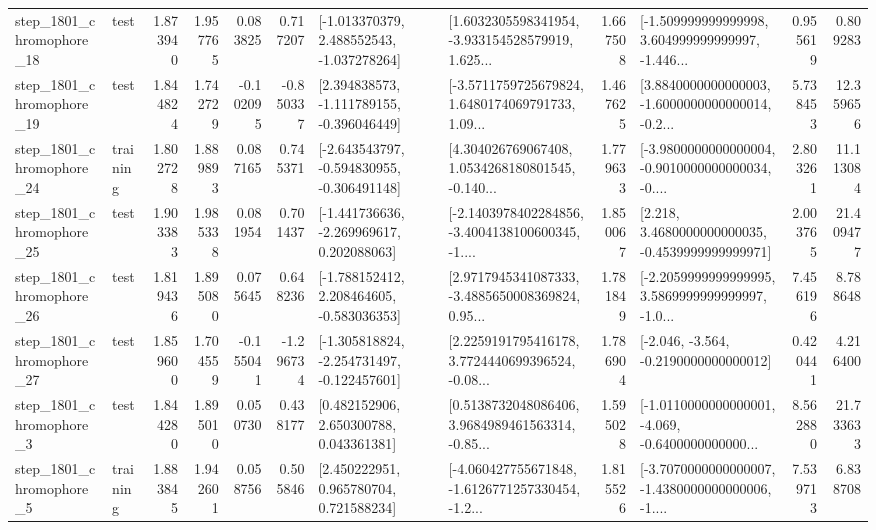\begin{tabular}{llrrrrllrlrr}
 step\_1801\_chromophore\_18 &      test &      1.873940 &    1.957765 &      0.083825 &  0.717207 &   [-1.013370379, 2.488552543, -1.037278264] &  [1.6032305598341954, -3.933154528579919, 1.625... &       1.667508 &  [-1.509999999999998, 3.604999999999997, -1.446... &            0.955619 &          0.809283 \\
 step\_1801\_chromophore\_19 &      test &      1.844824 &    1.742729 &     -0.102095 & -0.850337 &   [2.394838573, -1.111789155, -0.396046449] &  [-3.5711759725679824, 1.6480174069791733, 1.09... &       1.467625 &  [3.8840000000000003, -1.6000000000000014, -0.2... &            5.738453 &         12.359656 \\
 step\_1801\_chromophore\_24 &  training &      1.802728 &    1.889893 &      0.087165 &  0.745371 &  [-2.643543797, -0.594830955, -0.306491148] &  [4.304026769067408, 1.0534268180801545, -0.140... &       1.779633 &  [-3.9800000000000004, -0.9010000000000034, -0.... &            2.803261 &         11.113084 \\
 step\_1801\_chromophore\_25 &      test &      1.903383 &    1.985338 &      0.081954 &  0.701437 &   [-1.441736636, -2.269969617, 0.202088063] &  [-2.1403978402284856, -3.4004138100600345, -1.... &       1.850067 &   [2.218, 3.4680000000000035, -0.4539999999999971] &            2.003765 &         21.409477 \\
 step\_1801\_chromophore\_26 &      test &      1.819436 &    1.895080 &      0.075645 &  0.648236 &   [-1.788152412, 2.208464605, -0.583036353] &  [2.9717945341087333, -3.4885650008369824, 0.95... &       1.781849 &  [-2.2059999999999995, 3.5869999999999997, -1.0... &            7.456196 &          8.788648 \\
 step\_1801\_chromophore\_27 &      test &      1.859600 &    1.704559 &     -0.155041 & -1.296734 &  [-1.305818824, -2.254731497, -0.122457601] &  [2.2259191795416178, 3.7724440699396524, -0.08... &       1.786904 &              [-2.046, -3.564, -0.2190000000000012] &            0.420441 &          4.216400 \\
  step\_1801\_chromophore\_3 &      test &      1.844280 &    1.895010 &      0.050730 &  0.438177 &     [0.482152906, 2.650300788, 0.043361381] &  [0.5138732048086406, 3.9684989461563314, -0.85... &       1.595028 &  [-1.0110000000000001, -4.069, -0.6400000000000... &            8.562880 &         21.733633 \\
  step\_1801\_chromophore\_5 &  training &      1.883845 &    1.942601 &      0.058756 &  0.505846 &     [2.450222951, 0.965780704, 0.721588234] &  [-4.060427755671848, -1.6126771257330454, -1.2... &       1.815526 &  [-3.7070000000000007, -1.4380000000000006, -1.... &            7.539713 &          6.838708 \\

\end{tabular}
